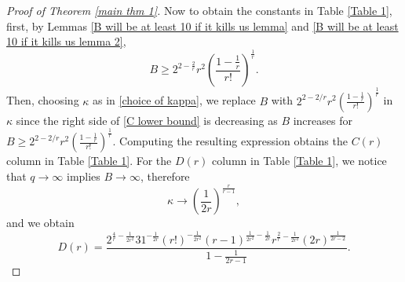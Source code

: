 \documentclass[12pt]{amsart}
\theoremstyle{plain}
\theoremstyle{definition}
\begin{document}
\begin{proof}[Proof of Theorem \ref{main thm 1}]
Now to obtain the constants in Table \ref{Table 1}, first, by Lemmas \ref{B will be at least 10 if it kills us lemma} and \ref{B will be at least 10 if it kills us lemma 2},
\begin{equation}\label{B lower bound123}
B\ge 2^{2-\frac{2}{r}}r^2\left(\frac{1-\frac{1}{r}}{r!}\right)^{\frac{1}{r}}.
\end{equation}
Then, choosing $\kappa$ as in \eqref{choice of kappa}, we replace $B$ with $2^{2-2/r}r^2\left(\frac{1-\frac{1}{r}}{r!}\right)^{\frac{1}{r}}$ in $\kappa$ since the right side of \eqref{C lower bound} is decreasing as $B$ increases for $B\ge 2^{2-2/r}r^2\left(\frac{1-\frac{1}{r}}{r!}\right)^{\frac{1}{r}}$. Computing the resulting expression obtains the $C(r)$ column in Table \ref{Table 1}. 
For the $D(r)$ column in Table \ref{Table 1}, we notice that $q\rightarrow \infty$ implies $B\rightarrow \infty$, therefore $$\kappa\rightarrow \left(\frac{1}{2r}\right)^{\frac{r}{r-1}},$$
and we obtain
$$D(r) = \frac{2^{\frac{4}{r}-\frac{1}{2r^2}}31^{-\frac{1}{2r}}(r!)^{-\frac{1}{2r^2}}(r-1)^{\frac{1}{2r^2}-\frac{1}{2r}}r^{\frac{2}{r}-\frac{1}{2r^2}}(2r)^{\frac{1}{2r-2}}}{1-\frac{1}{2r-1}}.$$
\end{proof}
\end{document}

